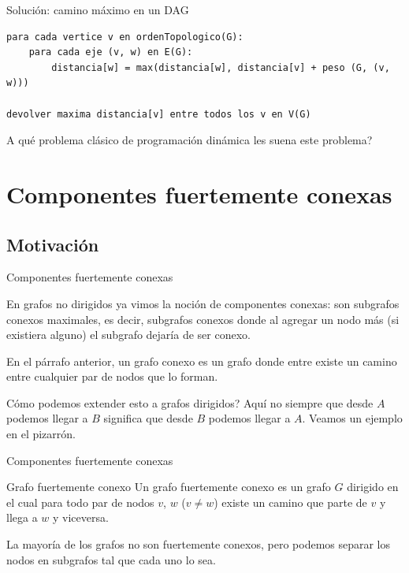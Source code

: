 \documentclass[compress]{beamer}
\begin{document}
\begin{frame}[fragile]{Solución: camino máximo en un DAG}

\begin{lstlisting}
para cada vertice v en ordenTopologico(G):
    para cada eje (v, w) en E(G):
        distancia[w] = max(distancia[w], distancia[v] + peso (G, (v, w)))

devolver maxima distancia[v] entre todos los v en V(G)
\end{lstlisting}

\bigskip

\textquestiondown A qué problema clásico de programación dinámica les
suena este problema?

\end{frame}

\section{Componentes fuertemente conexas}
\subsection{Motivación}
\begin{frame}{Componentes fuertemente conexas}

En grafos no dirigidos ya vimos la noción de componentes conexas: son
subgrafos conexos maximales, es decir, subgrafos conexos donde al agregar
un nodo más (si existiera alguno) el subgrafo dejaría de ser conexo. \\

\bigskip

En el párrafo anterior, un grafo conexo es un grafo donde entre existe
un camino entre cualquier par de nodos que lo forman. \\

\bigskip

\textquestiondown Cómo podemos extender esto a grafos dirigidos? Aquí
no siempre que desde $A$ podemos llegar a $B$ significa que desde $B$
podemos llegar a $A$. Veamos un ejemplo en el pizarrón.

\end{frame}


\begin{frame}{Componentes fuertemente conexas}

\begin{block}{Grafo fuertemente conexo}
Un grafo fuertemente conexo es un grafo $G$ dirigido en el cual para
todo par de nodos $v$, $w$ ($v \neq w$) existe un camino que parte de $v$
y llega a $w$ y viceversa.
\end{block}

\bigskip

La mayoría de los grafos no son fuertemente conexos, pero podemos
separar los nodos en subgrafos tal que cada uno lo sea.

\end{frame}
\end{document}
